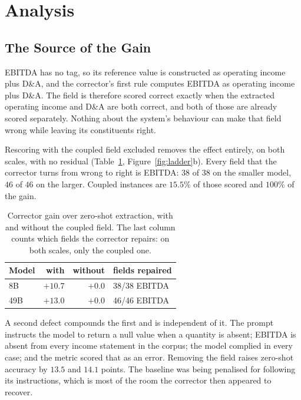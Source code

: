 \documentclass[11pt]{article}
\newcommand{\best}[1]{\textbf{#1}}
\begin{document}
\section{Analysis}
\label{sec:audit}

\subsection{The Source of the Gain}

EBITDA has no tag, so its reference value is constructed as operating income plus
D\&A, and the corrector's first rule computes EBITDA as operating income plus D\&A.
The field is therefore scored correct exactly when the extracted operating income and
D\&A are both correct, and both of those are already scored separately. Nothing about
the system's behaviour can make that field wrong while leaving its constituents right.

Rescoring with the coupled field excluded removes the effect entirely, on both scales,
with no residual (Table~\ref{tab:rescore}, Figure~\ref{fig:ladder}b). Every field that
the corrector turns from wrong to right is EBITDA: $38$ of $38$ on the smaller model,
$46$ of $46$ on the larger. Coupled instances are $15.5\%$ of those scored and $100\%$
of the gain.

\begin{table}[t]
\centering\small
\begin{tabular}{@{}lrrl@{}}
\toprule
\textbf{Model} & \textbf{with} & \textbf{without} & \textbf{fields repaired} \\
\midrule
8B  & $+10.7$ & \best{$+0.0$} & 38/38 EBITDA \\
49B & $+13.0$ & \best{$+0.0$} & 46/46 EBITDA \\
\bottomrule
\end{tabular}
\caption{Corrector gain over zero-shot extraction, with and without the coupled field.
The last column counts which fields the corrector repairs: on both scales, only the
coupled one.}
\label{tab:rescore}
\end{table}

A second defect compounds the first and is independent of it. The prompt instructs the
model to return a null value when a quantity is absent; EBITDA is absent from every
income statement in the corpus; the model complied in every case; and the metric scored
that as an error. Removing the field raises zero-shot accuracy by $13.5$ and $14.1$
points. The baseline was being penalised for following its instructions, which is most
of the room the corrector then appeared to recover.
\end{document}
